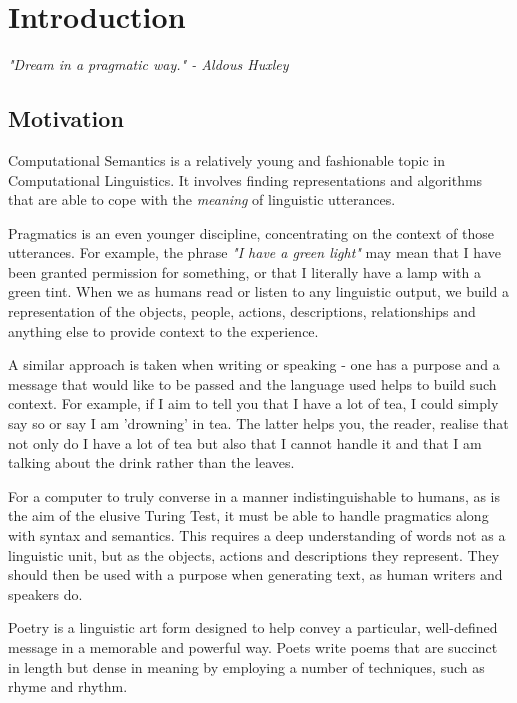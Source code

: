 \chapter{Introduction}
\ifpdf
    \graphicspath{{Introduction/IntroductionFigs/PNG/}{Introduction/IntroductionFigs/PDF/}{Introduction/IntroductionFigs/}}
\else
    \graphicspath{{Introduction/IntroductionFigs/EPS/}{Introduction/IntroductionFigs/}}
\fi
\emph{"Dream in a pragmatic way." - Aldous Huxley}
\section{Motivation}

Computational Semantics is a relatively young and fashionable topic in Computational Linguistics. It involves finding representations and algorithms that are able to cope with the \textit{meaning} of linguistic utterances.

Pragmatics is an even younger discipline, concentrating on the context of those utterances. For example, the phrase \textit{"I have a green light"} may mean that I have been granted permission for something, or that I literally have a lamp with a green tint. When we as humans read or listen to any linguistic output, we build a representation of the objects, people, actions, descriptions, relationships and anything else to provide context to the experience.

A similar approach is taken when writing or speaking - one has a purpose and a message that would like to be passed and the language used helps to build such context. For example, if I aim to tell you that I have a lot of tea, I could simply say so or say I am 'drowning' in tea. The latter helps you, the reader, realise that not only do I have a lot of tea but also that I cannot handle it and that I am talking about the drink rather than the leaves.

For a computer to truly converse in a manner indistinguishable to humans, as is the aim of the elusive Turing Test, it must be able to handle pragmatics along with syntax and semantics. This requires a deep understanding of words not as a linguistic unit, but as the objects, actions and descriptions they represent. They should then be used with a purpose when generating text, as human writers and speakers do.

Poetry is a linguistic art form designed to help convey a particular, well-defined message in a memorable and powerful way. Poets write poems that are succinct in length but dense in meaning by employing a number of techniques, such as rhyme and rhythm. 

